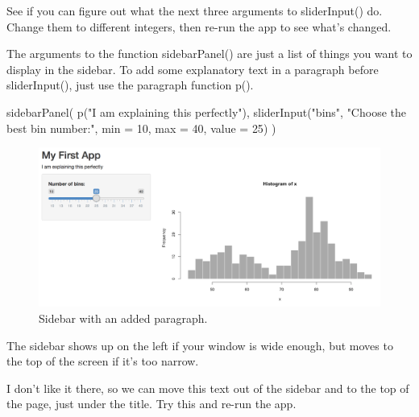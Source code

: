 \documentclass[
]{book}
\newenvironment{Shaded}{\begin{snugshade}}{\end{snugshade}}
\newcommand{\AttributeTok}[1]{\textcolor[rgb]{0.77,0.63,0.00}{#1}}
\newcommand{\DecValTok}[1]{\textcolor[rgb]{0.00,0.00,0.81}{#1}}
\newcommand{\FunctionTok}[1]{\textcolor[rgb]{0.00,0.00,0.00}{#1}}
\newcommand{\NormalTok}[1]{#1}
\newcommand{\StringTok}[1]{\textcolor[rgb]{0.31,0.60,0.02}{#1}}
\begin{document}
See if you can figure out what the next three arguments to sliderInput() do. Change them to different integers, then re-run the app to see what's changed.

The arguments to the function sidebarPanel() are just a list of things you want to display in the sidebar. To add some explanatory text in a paragraph before sliderInput(), just use the paragraph function p().

\begin{Shaded}
\begin{Highlighting}[]
      \FunctionTok{sidebarPanel}\NormalTok{(}
         \FunctionTok{p}\NormalTok{(}\StringTok{"I am explaining this perfectly"}\NormalTok{),}
         \FunctionTok{sliderInput}\NormalTok{(}\StringTok{"bins"}\NormalTok{,}
                     \StringTok{"Choose the best bin number:"}\NormalTok{,}
                     \AttributeTok{min =} \DecValTok{10}\NormalTok{,}
                     \AttributeTok{max =} \DecValTok{40}\NormalTok{,}
                     \AttributeTok{value =} \DecValTok{25}\NormalTok{)}
\NormalTok{      )}
\end{Highlighting}
\end{Shaded}

\begin{figure}

{\centering \includegraphics[width=1\linewidth]{images/demo_app/07-app-sidebar-p} 

}

\caption{Sidebar with an added paragraph.}\label{fig:first-app-sidebar-p}
\end{figure}

The sidebar shows up on the left if your window is wide enough, but moves to the top of the screen if it's too narrow.

I don't like it there, so we can move this text out of the sidebar and to the top of the page, just under the title. Try this and re-run the app.
\end{document}
